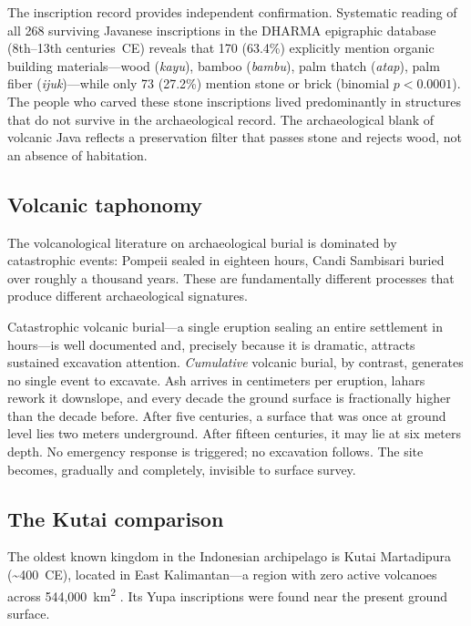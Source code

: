 \documentclass[12pt,a4paper]{article}
\begin{document}
The inscription record provides independent confirmation. Systematic reading of all 268 surviving Javanese inscriptions in the DHARMA epigraphic database (8th--13th centuries~CE) \citep{dharma2024} reveals that 170 (63.4\%) explicitly mention organic building materials---wood (\textit{kayu}), bamboo (\textit{bambu}), palm thatch (\textit{atap}), palm fiber (\textit{ijuk})---while only 73 (27.2\%) mention stone or brick (binomial $p < 0.0001$). The people who carved these stone inscriptions lived predominantly in structures that do not survive in the archaeological record. The archaeological blank of volcanic Java reflects a preservation filter that passes stone and rejects wood, not an absence of habitation.

\subsection{Volcanic taphonomy}

The volcanological literature on archaeological burial is dominated by catastrophic events: Pompeii sealed in eighteen hours, Candi Sambisari buried over roughly a thousand years. These are fundamentally different processes that produce different archaeological signatures.

Catastrophic volcanic burial---a single eruption sealing an entire settlement in hours---is well documented \citep{sigurdsson1985,doumas1983,sheets1992} and, precisely because it is dramatic, attracts sustained excavation attention. \textit{Cumulative} volcanic burial, by contrast, generates no single event to excavate. Ash arrives in centimeters per eruption, lahars rework it downslope, and every decade the ground surface is fractionally higher than the decade before. After five centuries, a surface that was once at ground level lies two meters underground. After fifteen centuries, it may lie at six meters depth. No emergency response is triggered; no excavation follows. The site becomes, gradually and completely, invisible to surface survey.

\subsection{The Kutai comparison}

The oldest known kingdom in the Indonesian archipelago is Kutai Martadipura (\textasciitilde400~CE), located in East Kalimantan---a region with zero active volcanoes across 544,000~km\textsuperscript{2} \citep{vogel1918}. Its Yupa inscriptions were found near the present ground surface.
\end{document}
